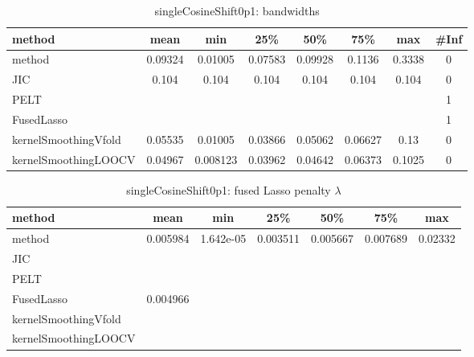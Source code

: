 \begin{table}[ht]
\centering
\begin{tabular}{l|c|ccccc|c}
  \hline
method & mean & min & 25\% & 50\% & 75\% & max & \#Inf \\ 
  \hline
method & 0.09324 & 0.01005 & 0.07583 & 0.09928 & 0.1136 & 0.3338 &   0 \\ 
  JIC & 0.104 & 0.104 & 0.104 & 0.104 & 0.104 & 0.104 &   0 \\ 
  PELT &  &  &  &  &  &  &   1 \\ 
  FusedLasso &  &  &  &  &  &  &   1 \\ 
  kernelSmoothingVfold & 0.05535 & 0.01005 & 0.03866 & 0.05062 & 0.06627 &  0.13 &   0 \\ 
  kernelSmoothingLOOCV & 0.04967 & 0.008123 & 0.03962 & 0.04642 & 0.06373 & 0.1025 &   0 \\ 
   \hline
\end{tabular}
\caption{singleCosineShift0p1: bandwidths} 
\label{tab:singleCosineShift0p1Bandwidths}
\end{table}
\begin{table}[ht]
\centering
\begin{tabular}{l|c|ccccc}
  \hline
method & mean & min & 25\% & 50\% & 75\% & max \\ 
  \hline
method & 0.005984 & 1.642e-05 & 0.003511 & 0.005667 & 0.007689 & 0.02332 \\ 
  JIC &  &  &  &  &  &  \\ 
  PELT &  &  &  &  &  &  \\ 
  FusedLasso & 0.004966 &  &  &  &  &  \\ 
  kernelSmoothingVfold &  &  &  &  &  &  \\ 
  kernelSmoothingLOOCV &  &  &  &  &  &  \\ 
   \hline
\end{tabular}
\caption{singleCosineShift0p1: fused Lasso penalty $\lambda$} 
\label{tab:singleCosineShift0p1Lambdas}
\end{table}
